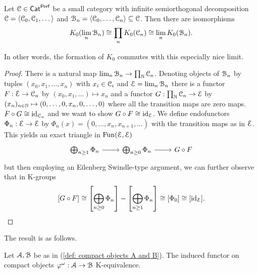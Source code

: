 \begin{lemma}\label{lem: K0 commutes with limits along SOD}
    Let $\EuScript{C}\in\mathsf{Cat}^{\mathsf{Perf}}$ be a small category with infinite semiorthogonal decomposition $\EuScript{C}=\langle\EuScript{C}_{0},\EuScript{C}_{1},\dots\rangle$ and $\EuScript{B}_{n}=\langle\EuScript{C}_{0},\dots,\EuScript{C}_{n}\rangle\subseteq\EuScript{C}$. Then there are isomorphisms
    $$K_{0}(\lim_{n}\EuScript{B}_{n})\cong\prod_{n}K_{0}(\EuScript{C}_{n})\cong\lim_{n}K_{0}(\EuScript{B}_{n}).$$
\end{lemma}
In other words, the formation of $K_{0}$ commutes with this especially nice limit. 
\begin{proof}
    There is a natural map $\lim_{n}\EuScript{B}_{n}\to\prod_{\mathbb{N}}\EuScript{C}_{n}$. Denoting objects of $\EuScript{B}_{n}$ by tuples $(x_{0},x_{1},\dots,x_{n})$ with $x_{i}\in\EuScript{C}_{i}$ and $\EuScript{E}=\lim_{n}\EuScript{B}_{n}$ there is a functor $F:\EuScript{E}\to\EuScript{C}_{n}$ by $(x_{0},x_{1},\dots)\mapsto x_{n}$ and a functor $G:\prod_{\mathbb{N}}\EuScript{C}_{n}\to\EuScript{E}$ by $(x_{n})_{n\in\mathbb{N}}\mapsto(0,\dots,0,x_{n},0,\dots,0)$ where all the transition maps are zero maps. $F\circ G\cong\mathrm{id}_{\EuScript{C}_{n}}$ and we want to show $G\circ F\cong\mathrm{id}_{\EuScript{E}}$. We define endofunctors $\Phi_{n}:\EuScript{E}\to\EuScript{E}$ by $\Phi_{n}(x)=(0,\dots,x_{n},x_{n+1},\dots)$ with the transition maps as in $\EuScript{E}$. This yields an exact triangle in $\mathrm{Fun}(\EuScript{E},\EuScript{E})$ 
    $$%
    \begin{tikzcd}
        {\bigoplus_{n\geq1}\Phi_{n}} & {\bigoplus_{n\geq0}\Phi_{n}} & {G\circ F}
        \arrow[from=1-1, to=1-2]
        \arrow[from=1-2, to=1-3]
    \end{tikzcd}$$
    but then employing an Eilenberg Swindle-type argument, we can further observe that in K-groups 
    $$[G\circ F]\cong\left[\bigoplus_{n\geq0}\Phi_{n}\right]-\left[\bigoplus_{n\geq1}\Phi_{n}\right]\cong[\Phi_{0}]\cong[\mathrm{id}_{\EuScript{E}}].$$
\end{proof}
The result is as follows. 
\begin{proposition}\label{prop: K-equivalence of functors A to B}
    Let $\EuScript{A},\EuScript{B}$ be as in (\ref{def: compact objects A and B}). The induced functor on compact objects $\varphi^{\omega}:\EuScript{A}\to\EuScript{B}$ K-equivalence.
\end{proposition}
